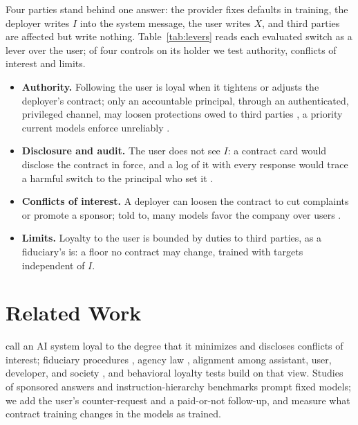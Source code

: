 \documentclass[letterpaper]{article} %
\begin{document}
Four parties stand behind one answer: the provider fixes defaults in training, the deployer writes $I$ into the system message, the user writes $X$, and third parties are affected but write nothing. Table~\ref{tab:levers} reads each evaluated switch as a lever over the user; of four controls on its holder we test authority, conflicts of interest and limits.
\begin{itemize}
    \item \textbf{Authority.} Following the user is loyal when it tightens or adjusts the deployer's contract; only an accountable principal, through an authenticated, privileged channel, may loosen protections owed to third parties \cite{wallace2024instruction,south2025authenticated}, a priority current models enforce unreliably \cite{geng2025control,zhang2025iheval}.
    \item \textbf{Disclosure and audit.} The user does not see $I$: a contract card would disclose the contract in force, and a log of it with every response would trace a harmful switch to the principal who set it \cite{chan2024visibility}.
    \item \textbf{Conflicts of interest.} A deployer can loosen the contract to cut complaints or promote a sponsor; told to, many models favor the company over users \cite{wu2026ads}.
    \item \textbf{Limits.} Loyalty to the user is bounded by duties to third parties, as a fiduciary's is: a floor no contract may change, trained with targets independent of $I$.
\end{itemize}







\section{Related Work}

\citet{aguirre2020loyalty} call an AI system loyal to the degree that it minimizes and discloses conflicts of interest; fiduciary procedures \cite{benthall2023fiduciary}, agency law \cite{kolt2025governing}, alignment among assistant, user, developer, and society \cite{gabriel2024ethics}, and behavioral loyalty tests \cite{greenwood2026loyalevals} build on that view. Studies of sponsored answers \cite{wu2026ads} and instruction-hierarchy benchmarks \cite{zhang2025iheval,geng2025control} prompt fixed models; we add the user's counter-request and a paid-or-not follow-up, and measure what contract training changes in the models as trained. 

\end{document}
